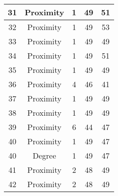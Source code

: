 \documentclass[results.tex]{subfiles}
\begin{document}
\begin{center}
\begin{tabular}{| c || c | c | c | c |}
            \hline
            31                      & Proximity                    & 1                      & 49                      & 51                   \\
            \hline
            32                      & Proximity                    & 1                      & 49                      & 53                   \\
            \hline
            33                      & Proximity                    & 1                      & 49                      & 49                   \\
            \hline
            34                      & Proximity                    & 1                      & 49                      & 51                   \\
            \hline
            35                      & Proximity                    & 1                      & 49                      & 49                   \\
            \hline
            36                      & Proximity                    & 4                      & 46                      & 41                   \\
            \hline
            37                      & Proximity                    & 1                      & 49                      & 49                   \\
            \hline
            38                      & Proximity                    & 1                      & 49                      & 49                   \\
            \hline
            39                      & Proximity                    & 6                      & 44                      & 47                   \\
            \hline
            40                      & Proximity                    & 1                      & 49                      & 47                   \\
            \hline
            40                      & Degree                       & 1                      & 49                      & 47                   \\
            \hline
            41                      & Proximity                    & 2                      & 48                      & 49                   \\
            \hline
            42                      & Proximity                    & 2                      & 48                      & 49                   \\

\end{tabular}
\end{center}
\end{document}
